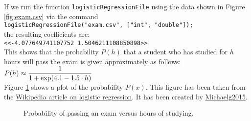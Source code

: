 If we run the function \texttt{logisticRegressionFile} using the data shown in Figure
\ref{fig:exam.csv} via
the command
\\[0.2cm]
\hspace*{1.3cm}
\texttt{logisticRegressionFile("exam.csv", ["int", "double"]);}
\\[0.2cm]
the resulting coefficients are:
\\[0.2cm]
\hspace*{1.3cm}
\texttt{<<-4.077649741107752 1.5046211108850898>>}
\\[0.2cm]
This shows that the probability $P(h)$ that a student who has studied for $h$ hours will pass the
exam is given approximately as follows:
\\[0.2cm]
\hspace*{1.3cm}
$\displaystyle P(h) \approx \frac{1}{1 + \exp(4.1 - 1.5 \cdot h)}$
\\[0.2cm]
Figure \ref{fig:exam-pass.eps} shows a plot of the probability $P(x)$.  This
figure has been taken from the
\href{https://en.wikipedia.org/wiki/Logistic_regression#Fields_and_example_applications}{Wikipedia article on logistic regression}. 
It has been created by \href{https://commons.wikimedia.org/w/index.php?curid=42442194}{Michaelg2015}.


\begin{figure}[!th]
\centering
{}
\vspace*{-0.3cm}
\caption{Probability of passing an exam versus hours of studying.}
\label{fig:exam-pass.eps}
\end{figure}



